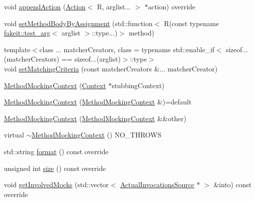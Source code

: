 \begin{DoxyCompactItemize}
\item 
void \mbox{\hyperlink{classfakeit_1_1MethodMockingContext_ad413d04564c89fe134dfb7bae1a1f2a1}{append\+Action}} (\mbox{\hyperlink{structfakeit_1_1Action}{Action}}$<$ R, arglist... $>$ $\ast$action) override
\item 
void \mbox{\hyperlink{classfakeit_1_1MethodMockingContext_ade0a1e36946f68957ee3717147122c4d}{set\+Method\+Body\+By\+Assignment}} (std\+::function$<$ R(const typename \mbox{\hyperlink{structfakeit_1_1test__arg}{fakeit\+::test\+\_\+arg}}$<$ arglist $>$\+::type...)$>$ method)
\item 
{\footnotesize template$<$class ... matcher\+Creators, class  = typename std\+::enable\+\_\+if$<$                sizeof...(matcher\+Creators) == sizeof...(arglist)$>$\+::type$>$ }\\void \mbox{\hyperlink{classfakeit_1_1MethodMockingContext_ab6bf85e9f9f5e5eeb2766ec487a42e20}{set\+Matching\+Criteria}} (const matcher\+Creators \&... matcher\+Creator)
\item 
\mbox{\hyperlink{classfakeit_1_1MethodMockingContext_aa5d0708f0a044fbc8080f64091f8aa71}{Method\+Mocking\+Context}} (\mbox{\hyperlink{structfakeit_1_1MethodMockingContext_1_1Context}{Context}} $\ast$stubbing\+Context)
\item 
\mbox{\hyperlink{classfakeit_1_1MethodMockingContext_aff21ad1769db1e3f81decc54c4b43ed3}{Method\+Mocking\+Context}} (\mbox{\hyperlink{classfakeit_1_1MethodMockingContext}{Method\+Mocking\+Context}} \&)=default
\item 
\mbox{\hyperlink{classfakeit_1_1MethodMockingContext_af4dcf1f0a24f7cedd1d4c5ee23d1a313}{Method\+Mocking\+Context}} (\mbox{\hyperlink{classfakeit_1_1MethodMockingContext}{Method\+Mocking\+Context}} \&\&other)
\item 
virtual \mbox{\hyperlink{classfakeit_1_1MethodMockingContext_a92068a8b1affe1c7be6eafc12297c8c2}{$\sim$\+Method\+Mocking\+Context}} () N\+O\+\_\+\+T\+H\+R\+O\+WS
\item 
std\+::string \mbox{\hyperlink{classfakeit_1_1MethodMockingContext_a0e71b77ab7f91d629a5853542d48624a}{format}} () const override
\item 
unsigned int \mbox{\hyperlink{classfakeit_1_1MethodMockingContext_a47e66f1a704bad7681f70a3e612d08a6}{size}} () const override
\item 
void \mbox{\hyperlink{classfakeit_1_1MethodMockingContext_ac66ba7b51a3c845b8fe8f2fa0f5f5ff0}{get\+Involved\+Mocks}} (std\+::vector$<$ \mbox{\hyperlink{structfakeit_1_1ActualInvocationsSource}{Actual\+Invocations\+Source}} $\ast$ $>$ \&into) const override

\end{DoxyCompactItemize}
